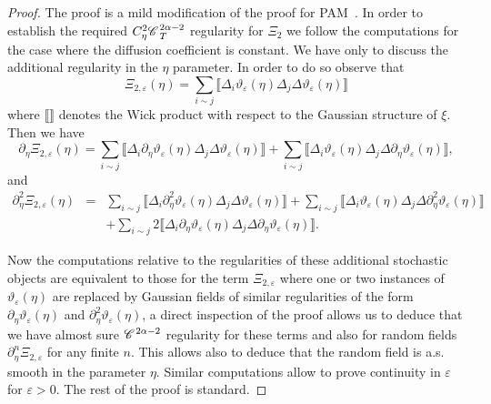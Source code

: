 \documentclass[11pt,reqno]{amsart}
\newcommand{\CC}{\mathscr{C} \hspace{.1em}}
\begin{document}
\begin{proof}
  The proof is a mild modification of the proof for
  PAM~{\cite{gubinelli_paracontrolled_2015}}. In order to establish the
  required $C^2_{\eta} \CC^{2 \alpha - 2}_T$ regularity for $\Xi_2$ we follow
  the computations for the case where the diffusion coefficient is constant.
  We have only to discuss the additional regularity in the $\eta$ parameter.
  In order to do so observe that
  \[ \Xi_{2, \varepsilon} (\eta) = \sum_{i \sim j} \llbracket \Delta_i
     \vartheta_{\varepsilon} (\eta) \Delta_j \Delta \vartheta_{\varepsilon}
     (\eta) \rrbracket \]
  where $\llbracket \rrbracket$ denotes the Wick product with respect to the
  Gaussian structure of $\xi$. Then we have
  \[ \partial_{\eta} \Xi_{2, \varepsilon} (\eta) = \sum_{i \sim j} \llbracket
     \Delta_i \partial_{\eta} \vartheta_{\varepsilon} (\eta) \Delta_j \Delta
     \vartheta_{\varepsilon} (\eta) \rrbracket + \sum_{i \sim j} \llbracket
     \Delta_i \vartheta_{\varepsilon} (\eta) \Delta_j \Delta \partial_{\eta}
     \vartheta_{\varepsilon} (\eta) \rrbracket, \]
  and
    \begin{eqnarray*}
    \partial_{\eta}^2 \Xi_{2, \varepsilon} (\eta) & = & \sum_{i \sim j}
    \llbracket \Delta_i \partial_{\eta}^2 \vartheta_{\varepsilon} (\eta)
    \Delta_j \Delta \vartheta_{\varepsilon} (\eta) \rrbracket + \sum_{i \sim
    j} \llbracket \Delta_i \vartheta_{\varepsilon} (\eta) \Delta_j \Delta
    \partial_{\eta}^2 \vartheta_{\varepsilon} (\eta) \rrbracket\\
    &  & + \sum_{i \sim j} 2 \llbracket \Delta_i \partial_{\eta}
    \vartheta_{\varepsilon} (\eta) \Delta_j \Delta \partial_{\eta}
    \vartheta_{\varepsilon} (\eta) \rrbracket .
  \end{eqnarray*}
  
  
  Now the computations relative to the regularities of these additional
  stochastic objects are equivalent to those for the term $\Xi_{2,
  \varepsilon}$ where one or two instances of $\vartheta_{\varepsilon} (\eta)$
  are replaced by Gaussian fields of similar regularities of the form
  $\partial_{\eta} \vartheta_{\varepsilon} (\eta)$ and $\partial_{\eta}^2
  \vartheta_{\varepsilon} (\eta)$, a direct inspection of the proof allows us
  to deduce that we have almost sure $\CC^{2 \alpha - 2}$ regularity for these
  terms and also for random fields $\partial_{\eta}^n \Xi_{2, \varepsilon}$
  for any finite $n$. This allows also to deduce that the random field is a.s.
  smooth in the parameter $\eta$. Similar computations allow to prove
  continuity in $\varepsilon$ for $\varepsilon > 0$. The rest of the proof is
  standard.
\end{proof}
\end{document}
